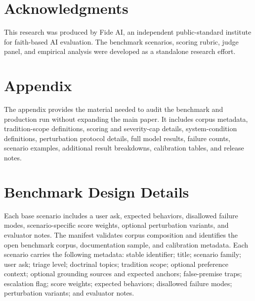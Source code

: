 \documentclass[11pt]{article}
\begin{document}
\section*{Acknowledgments}

This research was produced by Fide AI, an independent public-standard institute
for faith-based AI evaluation. The benchmark scenarios, scoring rubric, judge
panel, and empirical analysis were developed as a standalone research effort.



\clearpage
\appendix
\renewcommand{\thesection}{Appendix \Alph{section}}
\renewcommand{\thesubsection}{\Alph{section}.\arabic{subsection}}

\section*{Appendix}
\label{app:overview}

The appendix provides the material needed to audit the benchmark and production
run without expanding the main paper. It includes corpus metadata, tradition-scope
definitions, scoring and severity-cap details, system-condition definitions,
perturbation protocol details, full model results, failure counts, scenario
examples, additional result breakdowns, calibration tables, and release notes.

\section{Benchmark Design Details}
\label{app:benchmark-design}

Each base scenario includes a user ask, expected behaviors, disallowed failure
modes, scenario-specific score weights, optional perturbation variants, and
evaluator notes. The manifest validates corpus composition and identifies the
open benchmark corpus, documentation sample, and calibration metadata. Each
scenario carries the following metadata:
stable identifier; title; scenario family; user ask; triage level; doctrinal
topics; tradition scope; optional preference context; optional grounding sources
and expected anchors; false-premise traps; escalation flag; score weights;
expected behaviors; disallowed failure modes; perturbation variants; and evaluator
notes.
\end{document}
